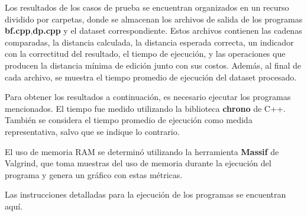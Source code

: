 
Los resultados de los casos de prueba se encuentran 
organizados en un recurso dividido por carpetas, donde 
se almacenan los archivos de salida de los programas \textbf{bf.cpp},\textbf{dp.cpp} y 
el dataset correspondiente. Estos archivos contienen las cadenas comparadas, 
la distancia calculada, la distancia esperada correcta, un indicador con la correctitud
del resultado, el tiempo de ejecución, y las operaciones que producen 
la distancia mínima de edición junto con sus costos. Además, al final de cada archivo, 
se muestra el tiempo promedio de ejecución del dataset procesado.

Para obtener los resultados a continuación, 
es necesario ejecutar los programas mencionados.
El tiempo fue medido utilizando
la biblioteca \textbf{chrono} de C++. También se considera el tiempo promedio de ejecución 
como medida representativa, salvo que se indique lo contrario.

El uso de memoria RAM se determinó utilizando la herramienta \textbf{Massif} 
de Valgrind, que toma muestras del uso de memoria durante la ejecución del programa 
y genera un gráfico con estas métricas.

Las instrucciones detalladas para la ejecución de los programas se encuentran aquí. 


